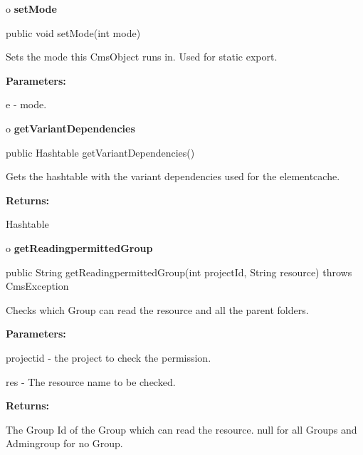 o {\bf setMode} 

\begin{PRE}
 public void setMode(int mode)
\end{PRE}

\begin{description}
\htmlDD Sets the mode this CmsObject runs in. Used for static export. 

\begin{description}
\item {\bf Parameters:}  

e - mode.  
\end{description}

\end{description}

o {\bf getVariantDependencies} 

\begin{PRE}
 public Hashtable getVariantDependencies()
\end{PRE}

\begin{description}
\htmlDD Gets the hashtable with the variant dependencies used for the
elementcache. 

\begin{description}
\item {\bf Returns:}  

Hashtable  
\end{description}

\end{description}

o {\bf getReadingpermittedGroup} 

\begin{PRE}
 public String getReadingpermittedGroup(int projectId,
                                        String resource) throws CmsException
\end{PRE}

\begin{description}
\htmlDD Checks which Group can read the resource and all the parent folders. 

\begin{description}
\item {\bf Parameters:}  

projectid - the project to check the permission.  

res - The resource name to be checked.  
\item {\bf Returns:}  

The Group Id of the Group which can read the resource.  null for all Groups
and  Admingroup for no Group.  
\end{description}

\end{description}

